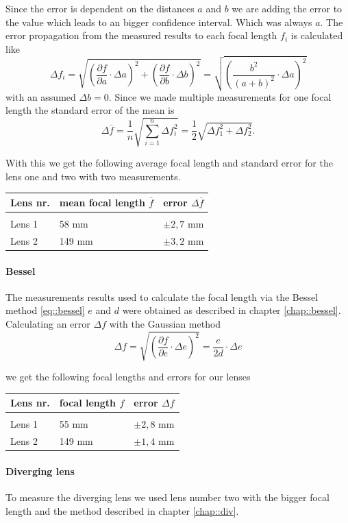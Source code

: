Since the error is dependent on the distances $a$ and $b$ we are adding the error to the value which leads to an bigger confidence interval.
Which was always $a$.
The error propagation from the measured results to each focal length $f_i$ is calculated like
\[
  \displaystyle	\Delta f_i = \sqrt{\left(\frac{\partial f}{\partial a} \cdot \Delta a \right)^2 +\left(\frac{\partial f}{\partial b} \cdot \Delta b\right)^2 } = \sqrt{\left(\frac{b^2}{(a+b)^2}\cdot \Delta a\right)^2}
\]
with an assumed $\Delta b = 0$. 
Since we made multiple measurements for one focal length the standard error of the mean is
\[
\displaystyle	\Delta \overline{f} =\frac{1}{n} \sqrt{\sum_{i=1}^{n}\Delta f_i^2} = \frac{1}{2}\sqrt{\Delta f_1^2 + \Delta f_2^2 }.
\]

With this we get the following average focal length and standard error for the lens one and two with two measurements.

	\begin{tabularx}{\textwidth}{XM{5cm}M{5cm}}%
		\toprule 
		Lens nr.& mean focal length $\overline{f}$ & error $\Delta \overline{f}$\\
		\hline
		&&\\[-5pt]
		Lens 1	& 58 \si{\milli \m} & $\pm 2,7$ \si{\milli \m}	\\
		Lens 2	& 149 \si{\milli \m} & $\pm 3,2$ \si{\milli \m}	\\
		

		\bottomrule 
	\end{tabularx}

\paragraph{Bessel}
The measurements results used to calculate the focal length via the Bessel method \ref{eq::bessel} $e$ and $d$ were obtained as described in chapter \ref{chap::bessel}.
Calculating an error $\Delta f$ with the Gaussian method
\[
\displaystyle	\Delta f = \sqrt{\left(\frac{\partial f}{\partial e} \cdot \Delta e \right)^2 } = \frac{e}{2d}\cdot \Delta e
\]

we get the following focal lengths and errors for our lenses

\begin{tabularx}{\textwidth}{XM{5cm}M{5cm}}%
	\toprule 
	Lens nr.&focal length $f$ & error $\Delta f$\\
	\hline
	&&\\[-5pt]
	Lens 1	& 55 \si{\milli \m} & $\pm 2,8$ \si{\milli \m}	\\
	Lens 2	& 149 \si{\milli \m} & $\pm 1,4$ \si{\milli \m}	\\	
	\bottomrule 
\end{tabularx}

\paragraph{Diverging lens}
To measure the diverging lens we used lens number two with the bigger focal length and the method described in chapter \ref{chap::div}.








